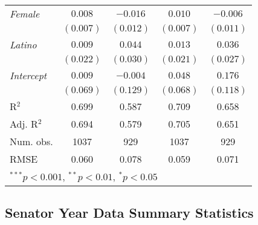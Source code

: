 \documentclass[12pt]{article}
\begin{document}
\begin{table}
\begin{center}
\begin{tabular}{l c c c c }
			\textit{Female}                        & $0.008$        & $-0.016$       & $0.010$        & $-0.006$       \\
			& $(0.007)$      & $(0.012)$      & $(0.007)$      & $(0.011)$      \\
			\textit{Latino}                        & $0.009$        & $0.044$        & $0.013$        & $0.036$        \\
			& $(0.022)$      & $(0.030)$      & $(0.021)$      & $(0.027)$      \\
			\textit{Intercept}                   & $0.009$        & $-0.004$       & $0.048$        & $0.176$        \\
			& $(0.069)$      & $(0.129)$      & $(0.068)$      & $(0.118)$      \\
			\hline
			R$^2$                         & 0.699          & 0.587          & 0.709          & 0.658          \\
			Adj. R$^2$                    & 0.694          & 0.579          & 0.705          & 0.651          \\
			Num. obs.                     & 1037           & 929            & 1037           & 929            \\
			RMSE                          & 0.060          & 0.078          & 0.059          & 0.071          \\
			\hline
			\multicolumn{5}{l}{\scriptsize{$^{***}p<0.001$, $^{**}p<0.01$, $^*p<0.05$}}
		\end{tabular}
	\end{center}
\end{table}

\clearpage

\pagebreak

\subsection{Senator Year Data Summary Statistics}
\end{document}
